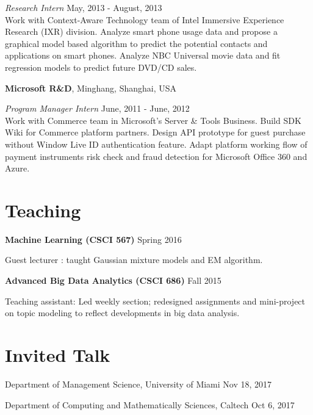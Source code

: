\documentclass[margin,line]{res}
\begin{document}
\begin{resume}
\vspace{-.3cm}
{\em Research Intern} \hfill { May, 2013 - August, 2013}\\
Work with Context-Aware Technology team of Intel Immersive Experience Research (IXR) division. 
Analyze smart phone usage data and propose a graphical model based algorithm to predict the potential contacts and applications on smart phones.
Analyze NBC Universal movie data and fit regression models to predict future DVD/CD sales.

{\bf  Microsoft R\&D}, Minghang, Shanghai, USA

\vspace{-.3cm}
{\em Program Manager Intern} \hfill {June, 2011 
- June, 2012}\\
 Work with Commerce team in Microsoft’s Server \& Tools Business.
 Build SDK Wiki for Commerce platform partners.  
 Design API prototype for guest purchase without Window Live ID authentication feature.
Adapt platform working flow of payment instruments risk check and fraud detection for Microsoft Office 360 and Azure.


\section{\sc Teaching }
 {\bf Machine Learning (CSCI 567)}   \hfill  { Spring 2016 } 
 
 \vspace{-.3cm}
 Guest  lecturer : taught Gaussian mixture models and EM algorithm.
 
 
 {\bf Advanced Big Data Analytics (CSCI 686)}   \hfill  {Fall 2015} 
 
 \vspace{-.3cm}
Teaching assistant: Led weekly section; redesigned assignments and mini-project on topic modeling to reflect developments in big data analysis. 


\section{\sc Invited Talk}
Department of Management Science,  University of Miami  \hfill {Nov 18, 2017}


Department of Computing and Mathematically Sciences,  Caltech  \hfill {Oct 6, 2017}



\end{resume}
\end{document}
